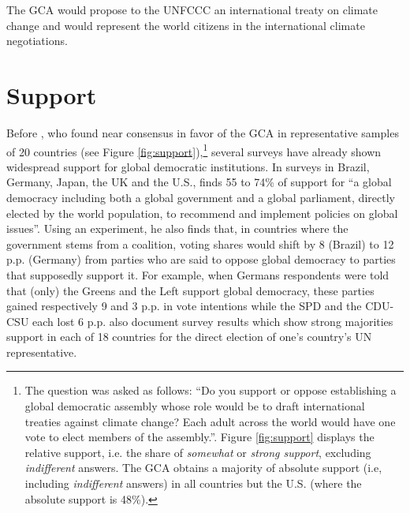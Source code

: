 \documentclass[12pt,english]{article}
\begin{document}
The GCA would propose to the UNFCCC an international treaty on climate change and would represent the world citizens in the international climate negotiations. %

\section{Support}\label{sec:support}

Before \citet{fabre_international_2023}, who found near consensus in favor of the GCA in representative samples of 20 countries (see Figure \ref{fig:support}),\footnote{The question was asked as follows: ``Do you support or oppose establishing a global democratic assembly whose role would be to draft international treaties against climate change? Each adult across the world would have one vote to elect members of the assembly.''. Figure \ref{fig:support} displays the relative support, i.e. the share of \textit{somewhat} or \textit{strong support}, excluding \textit{indifferent} answers. The GCA obtains a majority of absolute support (i.e, including \textit{indifferent} answers) in all countries but the U.S. (where the absolute support is 48\%).} several surveys have already shown widespread support for global democratic institutions. In surveys in Brazil, Germany, Japan, the UK and the U.S., \citet{ghassim_who_2020} finds 55 to 74\% of support for ``a global democracy including both a global government and a global parliament, directly elected by the world population, to recommend and implement policies on global issues''. %
Using an experiment, he also finds that, in countries where the government stems from a coalition, voting shares would shift by 8 (Brazil) to 12 p.p. (Germany) from parties who are said to oppose global democracy to parties that supposedly support it. For example, when Germans respondents were told that (only) the Greens and the Left support global democracy, these parties gained respectively 9 and 3 p.p. in vote intentions while the SPD and the CDU-CSU each lost 6 p.p.  
\citet{ghassim_who_2020} also document survey results which show strong majorities support in each of 18 countries for the direct election of one's country's UN representative. %
\end{document}
